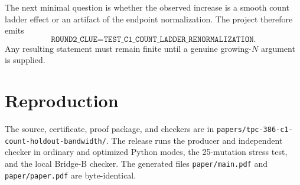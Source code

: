 \documentclass[10pt]{article}
\begin{document}
The next minimal question is whether the observed increase is a smooth count
ladder effect or an artifact of the endpoint normalization.  The project
therefore emits
\[
 \texttt{ROUND2\_CLUE=TEST\_C1\_COUNT\_LADDER\_RENORMALIZATION}.
\]
Any resulting statement must remain finite until a genuine growing-$N$
argument is supplied.

\enlargethispage{3\baselineskip}
\section*{Reproduction}

The source, certificate, proof package, and checkers are in
\texttt{papers/tpc-386-c1-count-holdout-bandwidth/}.  The release runs the
producer and independent checker in ordinary and optimized Python modes,
the 25-mutation stress test, and the local Bridge-B checker.  The generated
files \texttt{paper/main.pdf} and \texttt{paper/paper.pdf} are byte-identical.
\end{document}
